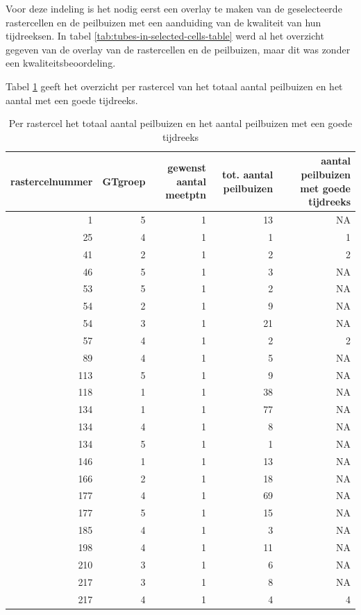 \documentclass[11pt,]{book}
\begin{document}
Voor deze indeling is het nodig eerst een overlay te maken van de
geselecteerde rastercellen en de peilbuizen met een aanduiding van de
kwaliteit van hun tijdreeksen. In tabel
\ref{tab:tubes-in-selected-cells-table} werd al het overzicht gegeven
van de overlay van de rastercellen en de peilbuizen, maar dit was zonder
een kwaliteitsbeoordeling.

Tabel \ref{tab:join-tubes-on-raster} geeft het overzicht per rastercel
van het totaal aantal peilbuizen en het aantal met een goede tijdreeks.

\begin{table}

\caption{\label{tab:join-tubes-on-raster}Per rastercel het totaal aantal peilbuizen en het aantal peilbuizen met een goede tijdreeks }
\centering
\begin{tabular}[t]{r|r|r|r|r}
\hline
rastercelnummer & GTgroep & gewenst aantal meetptn & tot. aantal peilbuizen & aantal peilbuizen met goede tijdreeks\\
\hline
1 & 5 & 1 & 13 & NA\\
\hline
25 & 4 & 1 & 1 & 1\\
\hline
41 & 2 & 1 & 2 & 2\\
\hline
46 & 5 & 1 & 3 & NA\\
\hline
53 & 5 & 1 & 2 & NA\\
\hline
54 & 2 & 1 & 9 & NA\\
\hline
54 & 3 & 1 & 21 & NA\\
\hline
57 & 4 & 1 & 2 & 2\\
\hline
89 & 4 & 1 & 5 & NA\\
\hline
113 & 5 & 1 & 9 & NA\\
\hline
118 & 1 & 1 & 38 & NA\\
\hline
134 & 1 & 1 & 77 & NA\\
\hline
134 & 4 & 1 & 8 & NA\\
\hline
134 & 5 & 1 & 1 & NA\\
\hline
146 & 1 & 1 & 13 & NA\\
\hline
166 & 2 & 1 & 18 & NA\\
\hline
177 & 4 & 1 & 69 & NA\\
\hline
177 & 5 & 1 & 15 & NA\\
\hline
185 & 4 & 1 & 3 & NA\\
\hline
198 & 4 & 1 & 11 & NA\\
\hline
210 & 3 & 1 & 6 & NA\\
\hline
217 & 3 & 1 & 8 & NA\\
\hline
217 & 4 & 1 & 4 & 4\\

\end{tabular}
\end{table}
\end{document}
